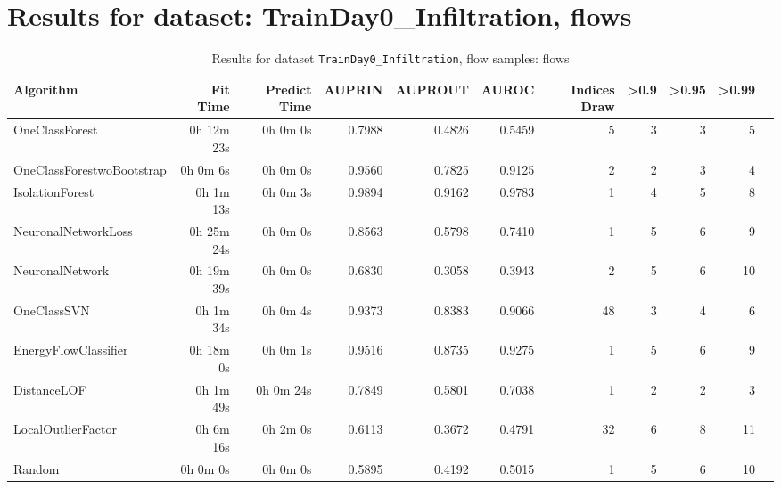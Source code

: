 \documentclass{article}
\begin{document}
\section*{Results for dataset: TrainDay0_Infiltration, flows}
\begin{table}[h!]
\centering
\caption{Results for dataset \texttt{TrainDay0_Infiltration}, flow samples: flows}
\label{tab:trainday0infiltration_flows}
\begin{tabular}{lrrrrrrrrrr}
\toprule
Algorithm & Fit Time & Predict Time & AUPRIN & AUPROUT & AUROC & Indices Draw & >0.9 & >0.95 & >0.99 \\
\midrule
OneClassForest & 0h 12m 23s & 0h 0m 0s & 0.7988 & 0.4826 & 0.5459 & 5 & 3 & 3 & 5 \\
OneClassForestwoBootstrap & 0h 0m 6s & 0h 0m 0s & 0.9560 & 0.7825 & 0.9125 & 2 & 2 & 3 & 4 \\
IsolationForest & 0h 1m 13s & 0h 0m 3s & 0.9894 & 0.9162 & 0.9783 & 1 & 4 & 5 & 8 \\
NeuronalNetworkLoss & 0h 25m 24s & 0h 0m 0s & 0.8563 & 0.5798 & 0.7410 & 1 & 5 & 6 & 9 \\
NeuronalNetwork & 0h 19m 39s & 0h 0m 0s & 0.6830 & 0.3058 & 0.3943 & 2 & 5 & 6 & 10 \\
OneClassSVN & 0h 1m 34s & 0h 0m 4s & 0.9373 & 0.8383 & 0.9066 & 48 & 3 & 4 & 6 \\
EnergyFlowClassifier & 0h 18m 0s & 0h 0m 1s & 0.9516 & 0.8735 & 0.9275 & 1 & 5 & 6 & 9 \\
DistanceLOF & 0h 1m 49s & 0h 0m 24s & 0.7849 & 0.5801 & 0.7038 & 1 & 2 & 2 & 3 \\
LocalOutlierFactor & 0h 6m 16s & 0h 2m 0s & 0.6113 & 0.3672 & 0.4791 & 32 & 6 & 8 & 11 \\
Random & 0h 0m 0s & 0h 0m 0s & 0.5895 & 0.4192 & 0.5015 & 1 & 5 & 6 & 10 \\
\bottomrule
\end{tabular}
\end{table}
\end{document}
